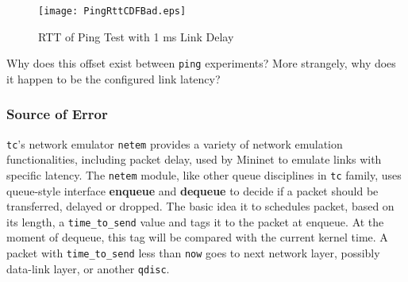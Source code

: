 \documentclass{acm_proc_article-sp}
\begin{document}
\begin{figure}[!ht]
        \centering
        \texttt{[image: PingRttCDFBad.eps]}
        \caption{RTT of Ping Test with 1 ms Link Delay}
        \label{Fig-PingBadRTT}
\end{figure}

Why does this offset exist between \texttt{ping} experiments?
More strangely, why does it happen to be the configured link latency?

\subsubsection{Source of Error}
\texttt{tc}'s network emulator \texttt{netem}\cite{Netem} provides a variety of network emulation functionalities, including packet delay, used by Mininet to emulate links with specific latency. 
The \texttt{netem} module, like other queue disciplines in \texttt{tc}\cite{Werner:TC:1999} family, uses queue-style interface \textbf{enqueue} and \textbf{dequeue} to decide if a packet should be transferred, delayed or dropped.
The basic idea it to schedules packet, based on its length, a \texttt{time\_to\_send} value and tags it to the packet at enqueue.
At the moment of dequeue, this tag will be compared with the current kernel time.
A packet with \texttt{time\_to\_send} less than \texttt{now} goes to next network layer, possibly data-link layer, or another \texttt{qdisc}.%
\end{document}
